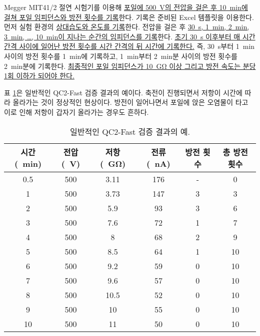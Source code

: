 Megger MIT41/2 절연 시험기를 이용해 \uline{포일에 \mbox{\SI{500}{\volt}}의 전압을 걸은 후 \mbox{\SI{10}{\minute}}에 걸쳐 포일 임피던스와 방전 횟수를 기록}한다. 기록은 준비된 Excel 템플릿을 이용한다. 먼저 실험 환경의 \uline{상대습도와 온도를 기록}한다. 전압을 걸은 후 \uline{\mbox{\SI{30}{\second}}, \mbox{\SI{1}{\minute}}, \mbox{\SI{2}{\minute}}, \mbox{\SI{3}{\minute}}, \dots, \mbox{\SI{10}{\minute}}이 지나는 순간의 임피던스를 기록}한다. \uline{초기 \mbox{\SI{30}{\second}} 이후부터 매 시간 간격 사이에 일어난 방전 횟수를 시간 간격의 뒤 시간에 기록한다.} 즉, \SI{30}{\second}부터 \SI{1}{\minute} 사이의 방전 횟수를 \SI{1}{\minute}에 기록하고, \SI{1}{\minute}부터 \SI{2}{\minute}분 사이의 방전 횟수를 \SI{2}{\minute}분에 기록한다. \uline{최종적인 포일 임피던스가 \mbox{\SI{10}{\giga\ohm}} 이상 그리고 방전 속도는 분당 1회 이하가 되어야 한다.}

표 \ref{tab:example_qc2_fast_result}은 일반적인 QC2-Fast 검증 결과의 예이다. 축전이 진행되면서 저항이 시간에 따라 올라가는 것이 정상적인 현상이다. 방전이 일어나면서 포일에 앉은 오염물이 타고 이로 인해 저항이 갑자기 올라가는 경우도 흔하다.

\begin{table}[htb]
  \centering
  \begin{tabular}{|c|c|c|c|c|c|}
    \hline
    시간 (\SI{}{\minute}) & 전압(\SI{}{\volt}) & 저항 (\SI{}{\giga\ohm}) & 전류 (\SI{}{\nano\ampere}) & 방전 횟수 & 총 방전 횟수\\
    \hline
    0.5 & 500 & 3.11 & 176 & - & 0\\
    1   & 500 & 3.73 & 147 & 3 & 3\\
    2   & 500 & 5.9  & 93  & 3 & 6\\
    3   & 500 & 7.6  & 72  & 1 & 7\\
    4   & 500 & 8    & 68  & 2 & 9\\
    5   & 500 & 8.5  & 64  & 1 & 10\\
    6   & 500 & 9.2  & 59  & 0 & 10\\
    7   & 500 & 9.6  & 57  & 0 & 10\\
    8   & 500 & 10.5 & 52  & 0 & 10\\
    9   & 500 & 10   & 55  & 0 & 10\\
    10  & 500 & 11   & 50  & 0 & 10\\
    \hline
  \end{tabular}
  \caption[일반적인 QC2-Fast 검증 결과의 예]{일반적인 QC2-Fast 검증 결과의 예.}
  \label{tab:example_qc2_fast_result}
\end{table}

